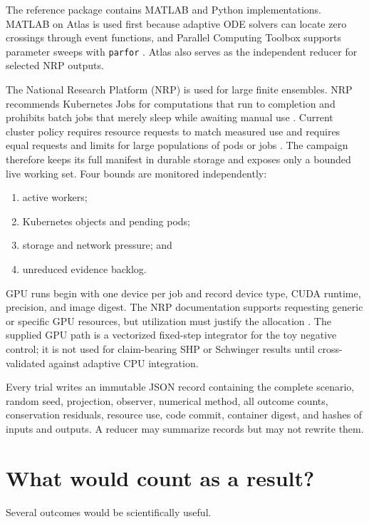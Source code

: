 \documentclass[aps,prd,reprint,nofootinbib,longbibliography]{revtex4-2}
\begin{document}
The reference package contains MATLAB and Python implementations.  MATLAB on Atlas
is used first because adaptive ODE solvers can locate zero crossings through event
functions, and Parallel Computing Toolbox supports parameter sweeps with
\texttt{parfor} \cite{MatlabODE45,MatlabParfor}.  Atlas also serves as the
independent reducer for selected NRP outputs.

The National Research Platform (NRP) is used for large finite ensembles.  NRP
recommends Kubernetes Jobs for computations that run to completion and prohibits
batch jobs that merely sleep while awaiting manual use \cite{NRPJobs}.  Current
cluster policy requires resource requests to match measured use and requires equal
requests and limits for large populations of pods or jobs \cite{NRPPolicies}.  The
campaign therefore keeps its full manifest in durable storage and exposes only a
bounded live working set.  Four bounds are monitored independently:

\begin{enumerate}[leftmargin=1.5em]
\item active workers;
\item Kubernetes objects and pending pods;
\item storage and network pressure; and
\item unreduced evidence backlog.
\end{enumerate}

GPU runs begin with one device per job and record device type, CUDA runtime,
precision, and image digest.  The NRP documentation supports requesting generic or
specific GPU resources, but utilization must justify the allocation
\cite{NRPGPU}.  The supplied GPU path is a vectorized fixed-step integrator for the
toy negative control; it is not used for claim-bearing SHP or Schwinger results
until cross-validated against adaptive CPU integration.

Every trial writes an immutable JSON record containing the complete scenario,
random seed, projection, observer, numerical method, all outcome counts,
conservation residuals, resource use, code commit, container digest, and hashes of
inputs and outputs.  A reducer may summarize records but may not rewrite them.

\section{What would count as a result?}

Several outcomes would be scientifically useful.
\end{document}
